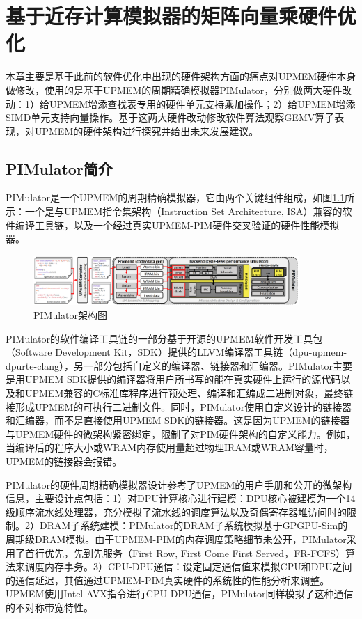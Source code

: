 \chapter{基于近存计算模拟器的矩阵向量乘硬件优化}
本章主要是基于此前的软件优化中出现的硬件架构方面的痛点对UPMEM硬件本身做修改，使用的是基于UPMEM的周期精确模拟器PIMulator\cite{uPimulator}，分别做两大硬件改动：1）给UPMEM增添查找表专用的硬件单元支持乘加操作；2）给UPMEM增添SIMD单元支持向量操作。基于这两大硬件改动修改软件算法观察GEMV算子表现，对UPMEM的硬件架构进行探究并给出未来发展建议。

\section{PIMulator简介}
PIMulator是一个UPMEM的周期精确模拟器\cite{uPimulator}，它由两个关键组件组成，如图\ref{PIMulator}所示：一个是与UPMEM指令集架构（Instruction Set Architecture, ISA）兼容的软件编译工具链，以及一个经过真实UPMEM-PIM硬件交叉验证的硬件性能模拟器。

\begin{figure}[!htbp]
	\centering
    \includegraphics[width=0.9\textwidth]{figures/PIMulator.png}
	\caption{PIMulator架构图}
    \label{PIMulator}
\end{figure}

PIMulator的软件编译工具链的一部分基于开源的UPMEM软件开发工具包（Software Development Kit，SDK）提供的LLVM\cite{LLVM}编译器工具链（dpu-upmem-dpurte-clang），另一部分包括自定义的编译器、链接器和汇编器。PIMulator主要是用UPMEM SDK提供的编译器将用户所书写的能在真实硬件上运行的源代码以及和UPMEM兼容的C标准库程序进行预处理、编译和汇编成二进制对象，最终链接形成UPMEM的可执行二进制文件。同时，PIMulator使用自定义设计的链接器和汇编器，而不是直接使用UPMEM SDK的链接器。这是因为UPMEM的链接器与UPMEM硬件的微架构紧密绑定，限制了对PIM硬件架构的自定义能力。例如，当编译后的程序大小或WRAM内存使用量超过物理IRAM或WRAM容量时，UPMEM的链接器会报错。

PIMulator的硬件周期精确模拟器设计参考了UPMEM的用户手册和公开的微架构信息，主要设计点包括：1）对DPU计算核心进行建模：DPU核心被建模为一个14级顺序流水线处理器，充分模拟了流水线的调度算法以及奇偶寄存器堆访问时的限制。2）DRAM子系统建模：PIMulator的DRAM子系统模拟基于GPGPU-Sim的周期级DRAM模拟\cite{GPGPU-Sim}。由于UPMEM-PIM的内存调度策略细节未公开，PIMulator采用了首行优先，先到先服务（First Row, First Come First Served，FR-FCFS）算法来调度内存事务。3）CPU-DPU通信：设定固定通信值来模拟CPU和DPU之间的通信延迟，其值通过UPMEM-PIM真实硬件的系统性的性能分析来调整。UPMEM使用Intel AVX指令进行CPU-DPU通信，PIMulator同样模拟了这种通信的不对称带宽特性。

